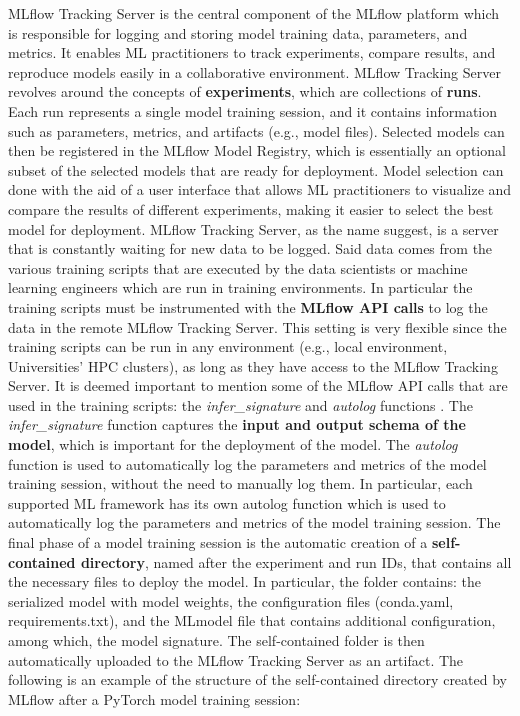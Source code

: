 MLflow Tracking Server is the central component of the MLflow platform which is responsible for logging and storing model training data, parameters, and metrics. 
It enables ML practitioners to track experiments, compare results, and reproduce models easily in a collaborative environment.
MLflow Tracking Server revolves around the concepts of \textbf{experiments}, which are collections of \textbf{runs}. 
Each run represents a single model training session, and it contains information such as parameters, metrics, and artifacts (e.g., model files).
Selected models can then be registered in the MLflow Model Registry, which is essentially an optional subset of the selected models that are ready for deployment.
Model selection can done with the aid of a user interface that allows ML practitioners to visualize and compare the results of different experiments, making it easier to select the best model for deployment.
MLflow Tracking Server, as the name suggest, is a server that is constantly waiting for new data to be logged. 
Said data comes from the various training scripts that are executed by the data scientists or machine learning engineers which are run in  training environments.
In particular the training scripts must be instrumented with the \textbf{MLflow API calls} to log the data in the remote MLflow Tracking Server.
This setting is very flexible since the training scripts can be run in any environment (e.g., local environment, Universities' HPC clusters), as long as they have access to the MLflow Tracking Server.
It is deemed important to mention some of the MLflow API calls that are used in the training scripts: the \textit{infer\_signature} and \textit{autolog} functions \cite{mlflow_docs}.
The \textit{infer\_signature} function captures the \textbf{input and output schema of the model}, which is important for the deployment of the model.
The \textit{autolog} function is used to automatically log the parameters and metrics of the model training session, without the need to manually log them. In particular, each supported ML framework has its own autolog function which is used to automatically log the parameters and metrics of the model training session.
The final phase of a model training session is the automatic creation of a \textbf{self-contained directory}, named after the experiment and run IDs, that contains all the necessary files to deploy the model. 
In particular, the folder contains: the serialized model with model weights, the configuration files (conda.yaml, requirements.txt), and the MLmodel file that contains additional configuration, among which, the model signature.
The self-contained folder is then automatically uploaded to the MLflow Tracking Server as an artifact.
The following is an example of the structure of the self-contained directory created by MLflow after a PyTorch model training session: \\

